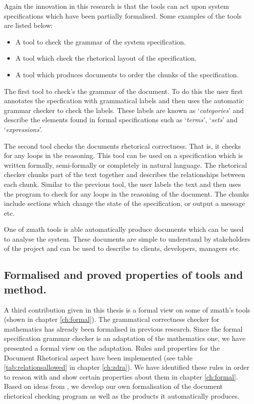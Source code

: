 Again the innovation in this research is that the tools can act upon system specifications which have been partially formalised. Some examples of the tools are listed below:

\begin{itemize}
\item A tool to check the grammar of the system specification.

\item A tool which check the rhetorical layout of the specification.

\item A tool which produces documents to order the chunks of the specification.
\end{itemize}

The first tool to check's the grammar of the document. To do this the user first annotates the specfication with grammatical labels and then uses the automatic grammar checker to check the labels. These labels are known as `\emph{categories}' and describe the elements found in formal specifications such as `\emph{terms}', `\emph{sets}' and `\emph{expressions}'. 

The second tool checks the documents rhetorical correctness. That is, it checks for any loops in the reasoning. This tool can be used on a specification which is written formally, semi-formally or completely in natural language. The rhetorical checker chunks part of the text together and describes the relationships between each chunk. Similar to the previous tool, the user labels the text and then uses the program to check for any loops in the reasoning of the document. The chunks include sections which change the state of the specification, or output a message etc.

One of \gls{zmath} tools is able automatically produce documents which can be used to analyse the system. These documents are simple to understand by stakeholders of the project and can be used to describe to clients, developers, managers etc. 

\subsection{Formalised and proved properties of tools and method.}

A third contribution given in this thesis is a formal view on some of \gls{zmath}'s tools (shown in chapter \ref{ch:formal}). The grammatical correctness checker for mathematics has already been formalised in previous research. Since the formal specification grammar checker is an adaptation of the mathematics one, we have presented a formal view on the adaptation. Rules and properties for the Document Rhetorical aspect have been implemented (see table \ref{tab:relationsallowed} in chapter \ref{ch:zdra}). We have identified these rules in order to reason with and show certain properties about them in chapter \ref{ch:formal}. Based on ideas from \cite{zengfirstyear}, we develop our own formalisation of the document rhetorical checking program as well as the products it automatically produces. 

